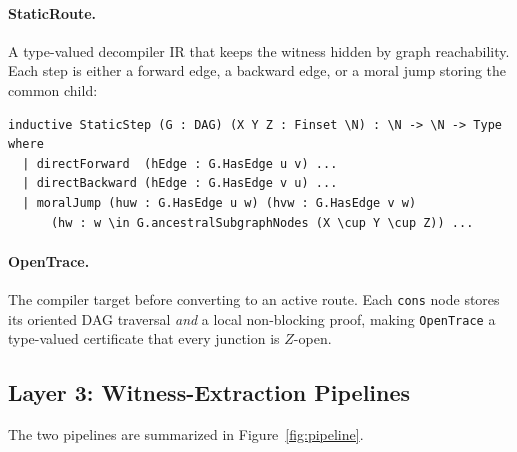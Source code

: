 \documentclass[acmsmall,screen,nonacm]{acmart}
\newcommand{\lean}[1]{\lstinline!#1!}
\newcommand{\N}{\mathbb{N}}
\begin{document}
\paragraph{StaticRoute.} A type-valued decompiler IR that keeps the witness
hidden by graph reachability.  Each step is either a forward edge, a backward
edge, or a moral jump storing the common child:

\begin{lstlisting}[caption={Static route IR (excerpt)}]
inductive StaticStep (G : DAG) (X Y Z : Finset \N) : \N -> \N -> Type where
  | directForward  (hEdge : G.HasEdge u v) ...
  | directBackward (hEdge : G.HasEdge v u) ...
  | moralJump (huw : G.HasEdge u w) (hvw : G.HasEdge v w)
      (hw : w \in G.ancestralSubgraphNodes (X \cup Y \cup Z)) ...
\end{lstlisting}

\paragraph{OpenTrace.} The compiler target before converting to an active route.
Each \lean{cons} node stores its oriented DAG traversal \emph{and} a local
non-blocking proof, making \lean{OpenTrace} a type-valued certificate that every
junction is $Z$-open.

\subsection{Layer 3: Witness-Extraction Pipelines}

The two pipelines are summarized in Figure~\ref{fig:pipeline}.
\end{document}
